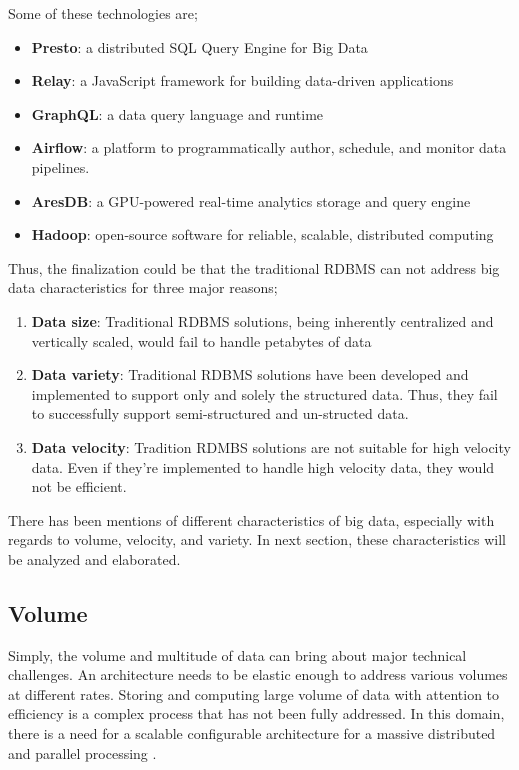 Some of these technologies are;

\begin{itemize}
    \item \textbf{Presto}: a distributed SQL Query Engine for Big Data
    \item \textbf{Relay}: a JavaScript framework for building data-driven applications
    \item \textbf{GraphQL}: a data query language and runtime
    \item \textbf{Airflow}: a platform to programmatically author, schedule, and monitor data pipelines.
    \item \textbf{AresDB}: a GPU-powered real-time analytics storage and query engine
    \item \textbf{Hadoop}: open-source software for reliable, scalable, distributed computing
\end{itemize}

Thus, the finalization could be that the traditional RDBMS can not address big data characteristics for three major reasons;

\begin{enumerate}
    \item \textbf{Data size}: Traditional RDBMS solutions, being inherently centralized and vertically scaled, would fail to handle petabytes of data
    \item \textbf{Data variety}: Traditional RDBMS solutions have been developed and implemented to support only and solely the structured data. Thus, they fail to successfully support semi-structured and un-structed data.
    \item \textbf{Data velocity}: Tradition RDMBS solutions are not suitable for high velocity data. Even if they’re implemented to handle high velocity data, they would not be efficient.
\end{enumerate}

There has been mentions of different characteristics of big data, especially with regards to volume, velocity, and variety. In next section, these characteristics will be analyzed and elaborated.

\subsection{Volume}

Simply, the volume and multitude of data can bring about major technical challenges. An architecture needs to be elastic enough to address various volumes at different rates. Storing and computing large volume of data with attention to efficiency is a complex process that has not been fully addressed. In this domain, there is a need for a scalable configurable architecture for a massive distributed and parallel processing \cite{Chen2016a}.

